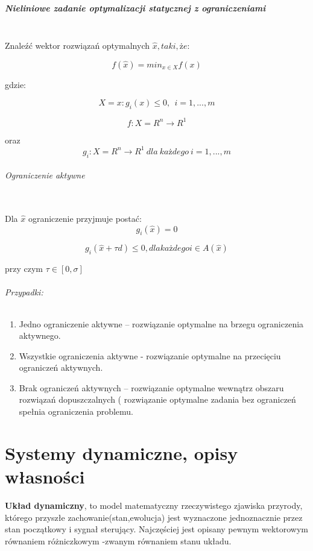 \documentclass[a4paper,twoside]{report}
\begin{document}
\paragraph{Nieliniowe zadanie optymalizacji statycznej z ograniczeniami\\\\}
Znaleźć wektor rozwiązań optymalnych $\hat{x}, taki, że:$

$$f(\hat{x})=min_{x \in X}f(x)$$

gdzie:

$$X={x:g_i(x) \le 0,~~i=1,...,m}$$

$$f:X = R^n \longrightarrow R^1$$

oraz $$g_i:X = R^n \longrightarrow R^1~dla~każdego~i=1,...,m$$

\subparagraph{Ograniczenie aktywne\\\\}

Dla $\hat{x}$ ograniczenie przyjmuje postać:
\[  g_i(\hat{x})=0 \]


$$ g_i(\hat{x}+\tau d) \le 0, dla każdego i \in A(\hat{x})$$

przy czym $\tau \in [0,\sigma]$



\subparagraph{Przypadki:}

\begin{enumerate}

\item Jedno ograniczenie aktywne – rozwiązanie optymalne na brzegu ograniczenia
aktywnego.
\item Wszystkie ograniczenia aktywne - rozwiązanie optymalne na przecięciu ograniczeń
aktywnych.
\item Brak ograniczeń aktywnych – rozwiązanie optymalne wewnątrz obszaru rozwiązań
dopuszczalnych ( rozwiązanie optymalne zadania bez ograniczeń spełnia
ograniczenia problemu.

\end{enumerate}

\chapter{Systemy dynamiczne, opisy własności}

\textbf{Układ dynamiczny}, to model matematyczny rzeczywistego zjawiska przyrody, którego przyszłe zachowanie(stan,ewolucja) jest wyznaczone jednoznacznie przez stan początkowy i sygnał sterujący. Najczęściej jest opisany pewnym wektorowym równaniem różniczkowym -zwanym równaniem stanu układu. 
\end{document}
